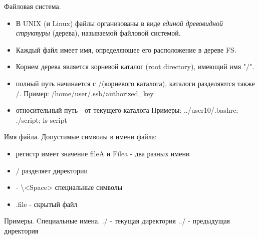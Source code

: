 
\begin{frame}{Файловая система.}
  \begin{itemize}
    \item В UNIX (и Linux) файлы организованы в виде \emph{единой древовидной структуры} (дерева), называемой \alert{файловой системой}.
    \item \alert{Каждый файл имеет имя}, определяющее его расположение в дереве FS.
    \item Корнем дерева является \alert{корневой каталог} (root directory), имеющий имя \alert{"/"}.
  \end{itemize} \pause

  \begin{itemize}
    \item \alert{полный путь} начинается с \alert{/}(корневого каталога), каталоги разделяются также \alert{/}. \newline
      Пример: /home/user/.ssh/authorized\_key
    \item \alert{относительный путь} - от текущего каталога \newline
      Примеры: ../user10/.bashrc; ./script; ls script
  \end{itemize}

\end{frame}

\begin{frame}[fragile]{Имя файла.}
        Допустимые символы в имени файла:
                \begin{itemize}
                    \item регистр имеет значение \alert{fileA} и \alert{Filea} - два разных имени
                    \item \alert{/} разделяет директории
                    \item \alert{-} \textbackslash <Space> специальные символы 
                    \item \alert{.file} - скрытый файл
                \end{itemize}

      \begin{block}{Примеры. Cпециальные имена.}
        \alert{./} - текущая директория
        \alert{../} - предыдущая директория
      \end{block}
\end{frame}

